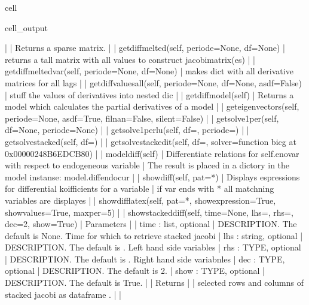 \documentclass[letterpaper,10pt,english]{jupyterBook}
\begin{document}
\begin{sphinxuseclass}{cell}
\begin{sphinxVerbatimOutput}
\begin{sphinxuseclass}{cell_output}
\begin{sphinxVerbatim}[commandchars=\\\{\}]
 |      
 |      Returns a sparse matrix.
 |  
 |  get\PYGZus{}diff\PYGZus{}melted(self, periode=None, df=None)
 |      returns a tall matrix with all values to construct jacobimatrix(es)
 |  
 |  get\PYGZus{}diff\PYGZus{}melted\PYGZus{}var(self, periode=None, df=None)
 |      makes dict with all  derivative matrices for all lags
 |  
 |  get\PYGZus{}diff\PYGZus{}values\PYGZus{}all(self, periode=None, df=None, asdf=False)
 |      stuff the values of derivatives into nested dic
 |  
 |  get\PYGZus{}diffmodel(self)
 |      Returns a model which calculates the partial derivatives of a model
 |  
 |  get\PYGZus{}eigenvectors(self, periode=None, asdf=True, filnan=False, silent=False)
 |  
 |  get\PYGZus{}solve1per(self, df=None, periode=None)
 |  
 |  get\PYGZus{}solve1perlu(self, df=\PYGZsq{}\PYGZsq{}, periode=\PYGZsq{}\PYGZsq{})
 |  
 |  get\PYGZus{}solvestacked(self, df=\PYGZsq{}\PYGZsq{})
 |  
 |  get\PYGZus{}solvestacked\PYGZus{}it(self, df=\PYGZsq{}\PYGZsq{}, solver=\PYGZlt{}function bicg at 0x00000248B6EDCB80\PYGZgt{})
 |  
 |  modeldiff(self)
 |      Differentiate relations for self.enovar with respect to endogeneous variable 
 |      The result is placed in a dictory in the model instanse: model.diffendocur
 |  
 |  show\PYGZus{}diff(self, pat=\PYGZsq{}*\PYGZsq{})
 |      Displays espressions for differential koifficients for a variable
 |      if var ends with * all matchning variables are displayes
 |  
 |  show\PYGZus{}diff\PYGZus{}latex(self, pat=\PYGZsq{}*\PYGZsq{}, show\PYGZus{}expression=True, show\PYGZus{}values=True, maxper=5)
 |  
 |  show\PYGZus{}stacked\PYGZus{}diff(self, time=None, lhs=\PYGZsq{}\PYGZsq{}, rhs=\PYGZsq{}\PYGZsq{}, dec=2, show=True)
 |      Parameters
 |      \PYGZhy{}\PYGZhy{}\PYGZhy{}\PYGZhy{}\PYGZhy{}\PYGZhy{}\PYGZhy{}\PYGZhy{}\PYGZhy{}\PYGZhy{}
 |      time : list, optional
 |          DESCRIPTION. The default is None. Time for which to retrieve stacked jacobi
 |      lhs : string, optional
 |          DESCRIPTION. The default is \PYGZsq{}\PYGZsq{}. Left hand side variables 
 |      rhs : TYPE, optional
 |          DESCRIPTION. The default is \PYGZsq{}\PYGZsq{}. Right hand side variabnles 
 |      dec : TYPE, optional
 |          DESCRIPTION. The default is 2.
 |      show : TYPE, optional
 |          DESCRIPTION. The default is True.
 |      
 |      Returns
 |      \PYGZhy{}\PYGZhy{}\PYGZhy{}\PYGZhy{}\PYGZhy{}\PYGZhy{}\PYGZhy{}
 |      selected rows and columns of stacked jacobi as dataframe .
 |  
 |  \PYGZhy{}\PYGZhy{}\PYGZhy{}\PYGZhy{}\PYGZhy{}\PYGZhy{}\PYGZhy{}\PYGZhy{}\PYGZhy{}\PYGZhy{}\PYGZhy{}\PYGZhy{}\PYGZhy{}\PYGZhy{}\PYGZhy{}\PYGZhy{}\PYGZhy{}\PYGZhy{}\PYGZhy{}\PYGZhy{}\PYGZhy{}\PYGZhy{}\PYGZhy{}\PYGZhy{}\PYGZhy{}\PYGZhy{}\PYGZhy{}\PYGZhy{}\PYGZhy{}\PYGZhy{}\PYGZhy{}\PYGZhy{}\PYGZhy{}\PYGZhy{}\PYGZhy{}\PYGZhy{}\PYGZhy{}\PYGZhy{}\PYGZhy{}\PYGZhy{}\PYGZhy{}\PYGZhy{}\PYGZhy{}\PYGZhy{}\PYGZhy{}\PYGZhy{}\PYGZhy{}\PYGZhy{}\PYGZhy{}\PYGZhy{}\PYGZhy{}\PYGZhy{}\PYGZhy{}\PYGZhy{}\PYGZhy{}\PYGZhy{}\PYGZhy{}\PYGZhy{}\PYGZhy{}\PYGZhy{}\PYGZhy{}\PYGZhy{}\PYGZhy{}\PYGZhy{}\PYGZhy{}\PYGZhy{}\PYGZhy{}\PYGZhy{}\PYGZhy{}\PYGZhy{}

\end{sphinxVerbatim}
\end{sphinxuseclass}
\end{sphinxVerbatimOutput}
\end{sphinxuseclass}
\end{document}
